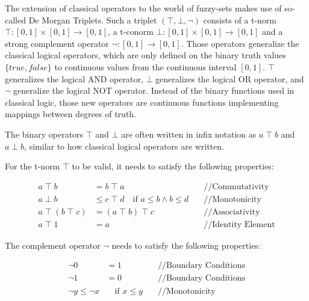 The extension of classical operators to the world of fuzzy-sets makes use of so-called De Morgan Triplets. Such a triplet $(\top, \bot, \neg)$ consists of a t-norm $\top : [0, 1] \times [0, 1] \rightarrow [0, 1]$, a t-conorm $\bot : [0, 1] \times [0, 1] \rightarrow [0, 1]$ and a strong complement operator $\neg : [0, 1] \rightarrow [0, 1]$. Those operators generalize the classical logical operators, which are only defined on the binary truth values $\{true, false\}$ to continuous values from the continuous interval $[0, 1]$. $\top$ generalizes the logical AND operator, $\bot$ generalizes the logical OR operator, and $\neg$ generalize the logical NOT operator. Instead of the binary functions used in classical logic, those new operators are continuous functions implementing mappings between degrees of truth.

The binary operators $\top$ and $\bot$ are often written in infix notation as $a \; \top \; b$ and $a \; \bot \; b$, similar to how classical logical operators are written.

For the t-norm $\top$ to be valid, it needs to satisfy the following properties:

\begin{align*}
      a \; \top \; b                & = b \; \top \; a                                              & \quad \text{//Commutativity}    \\
      a \; \bot \; b                & \leq c \; \top \; d  \quad \text{if }  a\leq b \land b \leq d & \quad \text{//Monotonicity}     \\
      a \; \top \; (b \; \top \; c) & = (a \; \top \; b) \; \top \; c                               & \quad \text{//Associativity}    \\
      a \; \top \; 1                & = a                                                           & \quad \text{//Identity Element}
\end{align*}

The complement operator $\neg$ needs to satisfy the following properties:

\begin{align*}
      \neg 0             & = 1                       & \quad \text{//Boundary Conditions} \\
      \neg 1             & = 0                       & \quad \text{//Boundary Conditions} \\
      \neg y \leq \neg x & \quad \text{if } x \leq y & \quad \text{//Monotonicity}
\end{align*}

